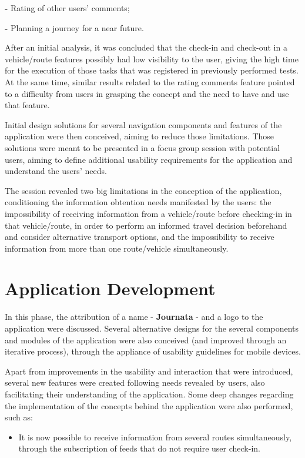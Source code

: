 \documentclass[9pt,a4paper]{extarticle}
\begin{document}
\begin{multicols}{2}
\textbf{-} Rating of other users' comments;

\textbf{-} Planning a journey for a near future.

After an initial analysis, it was concluded that the check-in and check-out in a vehicle/route features possibly had low visibility to the user, giving the high time for the execution of those tasks that was registered in previously performed tests. At the same time, similar results related to the rating comments feature pointed to a difficulty from users in grasping the concept and the need to have and use that feature.

Initial design solutions for several navigation components and features of the application were then conceived, aiming to reduce those limitations. Those solutions were meant to be presented in a focus group session with potential users, aiming to define additional usability requirements for the application and understand the users' needs.

The session revealed two big limitations in the conception of the application, conditioning the information obtention needs manifested by the users: the impossibility of receiving information from a vehicle/route before checking-in in that vehicle/route, in order to perform an informed travel decision beforehand and consider alternative transport options, and the impossibility to receive information from more than one route/vehicle simultaneously.

\section{Application Development}

In this phase, the attribution of a name - \textbf{Journata} - and a logo to the application were discussed. Several alternative designs for the several components and modules of the application were also conceived (and improved through an iterative process), through the appliance of usability guidelines for mobile devices.

Apart from improvements in the usability and interaction that were introduced, several new features were created following needs revealed by users, also facilitating their understanding of the application. Some deep changes regarding the implementation of the concepts behind the application were also performed, such as:

\begin{itemize}
\item It is now possible to receive information from several routes simultaneously, through the subscription of feeds that do not require user check-in.


\end{itemize}
\end{multicols}
\end{document}
